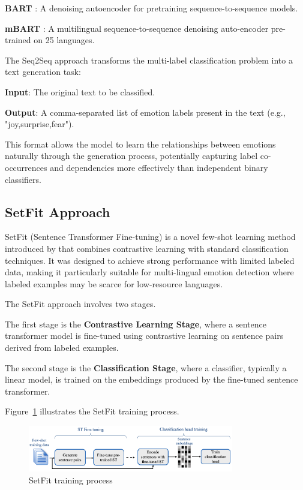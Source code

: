 \documentclass[a4paper,12pt]{extarticle}
\begin{document}
\textbf{BART} \cite{lewis2019bartdenoisingsequencetosequencepretraining}: A denoising autoencoder for pretraining sequence-to-sequence models. 

\textbf{mBART} \cite{liu2020multilingualdenoisingpretrainingneural}: A multilingual sequence-to-sequence denoising auto-encoder pre-trained on 25 languages.

The Seq2Seq approach transforms the multi-label classification problem into a text generation task:

\textbf{Input}: The original text to be classified. 

\textbf{Output}: A comma-separated list of emotion labels present in the text (e.g., "joy,surprise,fear").

This format allows the model to learn the relationships between emotions naturally through the generation process, potentially capturing label co-occurrences and dependencies more effectively than independent binary classifiers.

\subsection{SetFit Approach}

SetFit (Sentence Transformer Fine-tuning) is a novel few-shot learning method introduced by \cite{tunstall2022efficient} that combines contrastive learning with standard classification techniques. It was designed to achieve strong performance with limited labeled data, making it particularly suitable for multi-lingual emotion detection where labeled examples may be scarce for low-resource languages.

The SetFit approach involves two stages. 

The first stage is the \textbf{Contrastive Learning Stage}, where a sentence transformer model is fine-tuned using contrastive learning on sentence pairs derived from labeled examples. 

The second stage is the \textbf{Classification Stage}, where a classifier, typically a linear model, is trained on the embeddings produced by the fine-tuned sentence transformer.

Figure~\ref{fig:setfit_training} illustrates the SetFit training process.

\begin{figure}[h]
    \centering
    \includegraphics[width=0.8\textwidth]{setfit.png}
    \caption{SetFit training process}
    \label{fig:setfit_training}
\end{figure}
\end{document}
